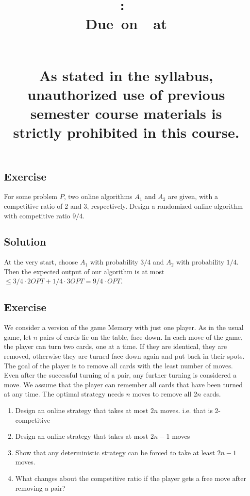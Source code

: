 \documentclass{article}
\title{
    \vspace{2in}
    \textbf{\hmwkClass:\ \hmwkTitle}\\
    \normalsize\vspace{0.1in}\small{Due\ on\ \hmwkDueDate\ at \hmwkDueTime}\\
    \vspace{0.1in}\large{\textit{\hmwkClassInstructor\ \hmwkSection}} \\
    \vspace{0.8in}
    \begin{minipage}[t]{0.4\columnwidth}
        {\footnotesize\textbf{As stated in the syllabus, unauthorized use of previous semester course materials is strictly prohibited in this course.
        }}
    \vspace{0.5in}
    \end{minipage}
    \vspace{0.8in}
    \author{\textbf{\hmwkAuthorName}}
    \date{}
}
\newcounter{counter}
\newcommand{\Exercise}{Exercise \stepcounter{counter}\thecounter}
\begin{document}
\maketitle
\pagebreak

\subsection*{\Exercise}
  For some problem $P$, two online algorithms $A_1$ and $A_2$ are given, with a
  competitive ratio of 2 and 3, respectively. Design a randomized online
  algorithm with competitive ratio $9/4$.

\subsection*{Solution}
  At the very start, choose $A_1$ with probability $3/4$ and $A_2$ with probability $1/4$. Then the expected output of our algorithm is at most $\leq 3/4\cdot 2OPT + 1/4 \cdot 3OPT = 9/4\cdot OPT$.

\subsection*{\Exercise}
    We consider a version of the game Memory with just one player. As in the usual game, let $n$ pairs of cards lie on the table, face down. In each move of the game, the player can turn two cards, one at a time. If they are identical, they are removed, otherwise they are turned face down again and put back in their spots. The goal of the player is to remove all cards with the least number of moves. Even after the successful turning of a pair, any further turning is considered a move. We assume that the player can remember all cards that have been turned at any time. The optimal strategy needs $n$ moves to remove all $2n$ cards.
    \begin{enumerate}
        \item Design an online strategy that takes at most $2n$ moves. i.e. that is 2-competitive
        \item Design an online strategy that takes at most $2n-1$ moves
        \item Show that any deterministic strategy can be forced to take at least $2n-1$ moves.
        \item What changes about the competitive ratio if the player gets a free move after removing a pair?
    \end{enumerate}
  
\end{document}
